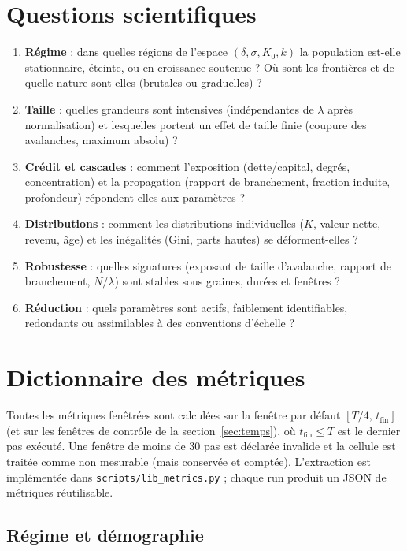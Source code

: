 \documentclass[11pt,a4paper]{article}
\newcommand{\code}[1]{\texttt{#1}}
\begin{document}
\section{Questions scientifiques}

\begin{enumerate}
\item \textbf{Régime} : dans quelles régions de l'espace
  $(\delta,\sigma,K_0,k)$ la population est-elle stationnaire, éteinte, ou
  en croissance soutenue ? Où sont les frontières et de quelle nature
  sont-elles (brutales ou graduelles) ?
\item \textbf{Taille} : quelles grandeurs sont intensives (indépendantes de
  $\lambda$ après normalisation) et lesquelles portent un effet de taille
  finie (coupure des avalanches, maximum absolu) ?
\item \textbf{Crédit et cascades} : comment l'exposition (dette/capital,
  degrés, concentration) et la propagation (rapport de branchement,
  fraction induite, profondeur) répondent-elles aux paramètres ?
\item \textbf{Distributions} : comment les distributions individuelles
  ($K$, valeur nette, revenu, âge) et les inégalités (Gini, parts hautes)
  se déforment-elles ?
\item \textbf{Robustesse} : quelles signatures (exposant de taille
  d'avalanche, rapport de branchement, $N/\lambda$) sont stables sous
  graines, durées et fenêtres ?
\item \textbf{Réduction} : quels paramètres sont actifs, faiblement
  identifiables, redondants ou assimilables à des conventions d'échelle ?
\end{enumerate}

\section{Dictionnaire des métriques}
\label{sec:metriques}

Toutes les métriques fenêtrées sont calculées sur la fenêtre par défaut
$[T/4,\,t_{\mathrm{fin}}]$ (et sur les fenêtres de contrôle de la
section~\ref{sec:temps}), où $t_{\mathrm{fin}}\le T$ est le dernier pas
exécuté. Une fenêtre de moins de 30 pas est déclarée invalide et la cellule
est traitée comme non mesurable (mais conservée et comptée). L'extraction
est implémentée dans \code{scripts/lib\_metrics.py} ; chaque run produit un
JSON de métriques réutilisable.

\subsection{Régime et démographie}
\end{document}
